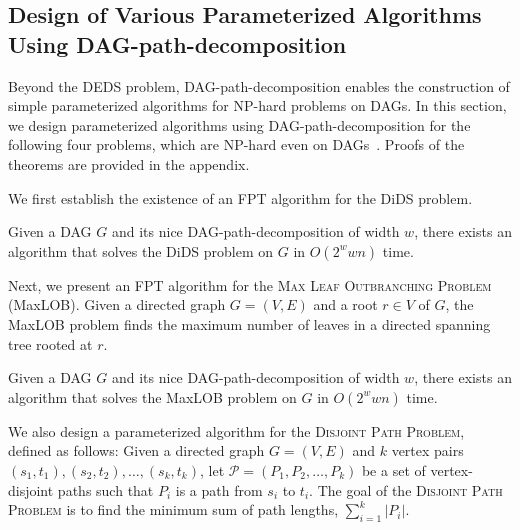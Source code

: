\documentclass[runningheads]{llncs}
\theoremstyle{plain}
\theoremstyle{definition}
\begin{document}
\subsection{Design of Various Parameterized Algorithms Using DAG-path-decomposition}

Beyond the DEDS problem, DAG-path-decomposition enables the construction of simple parameterized algorithms for NP-hard problems on DAGs.  
In this section, we design parameterized algorithms using DAG-path-decomposition for the following four problems, which are NP-hard even on DAGs~\cite{art17}.  
Proofs of the theorems are provided in the appendix.  

We first establish the existence of an FPT algorithm for the DiDS problem. %

\begin{theorem}\label{theorem_dids}
    Given a DAG \(G\) and its nice DAG-path-decomposition of width \(w\), there exists an algorithm that solves the DiDS problem on \(G\) in \(O(2^w w n)\) time.  
\end{theorem}

Next, we present an FPT algorithm for the \textsc{Max Leaf Outbranching Problem} (MaxLOB).  
Given a directed graph \(G = (V, E)\) and a root \(r \in V\) of $G$, the MaxLOB problem finds the maximum number of leaves in a directed spanning tree rooted at \(r\). 

\begin{theorem}\label{theorem_lob}
    Given a DAG \(G\) and its nice DAG-path-decomposition of width \(w\), there exists an algorithm that solves the MaxLOB problem on \(G\) in \(O(2^w w n)\) time.  
\end{theorem}

We also design a parameterized algorithm for the \textsc{Disjoint Path Problem}, defined as follows:  
Given a directed graph \(G = (V, E)\) and \(k\) vertex pairs \((s_1, t_1), (s_2, t_2), \dots, (s_k, t_k)\), let \(\mathcal{P} = (P_1, P_2, \dots, P_k)\) be a set of vertex-disjoint paths such that $P_i$ is a path from \(s_i\) to \(t_i\).  
The goal of the \textsc{Disjoint Path Problem} is to find the minimum sum of path lengths, \(\sum_{i=1}^{k} |P_i|\).  
\end{document}

